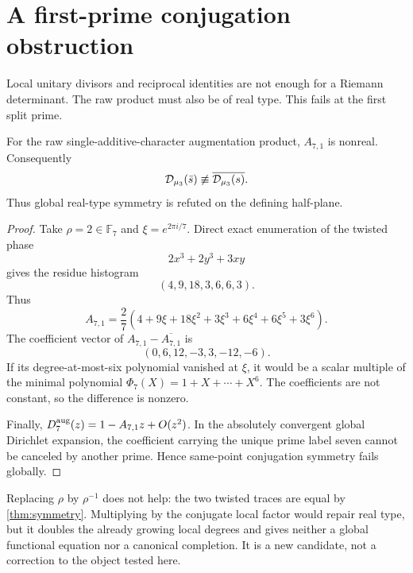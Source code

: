 \section{A first-prime conjugation obstruction}

Local unitary divisors and reciprocal identities are not enough for a
Riemann determinant.  The raw product must also be of real type.  This fails
at the first split prime.

\begin{theorem}[Exact $p=7$ obstruction]\label{thm:p7}
For the raw single-additive-character augmentation product, $A_{7,1}$ is
nonreal.  Consequently
\[
\mathcal D_{\mu_3}(\bar s)\not\equiv\overline{\mathcal D_{\mu_3}(s)}.
\]
Thus global real-type symmetry is refuted on the defining half-plane.
\end{theorem}

\begin{proof}
Take $\rho=2\in\mathbb F_7$ and $\xi=e^{2\pi i/7}$.  Direct exact
enumeration of the twisted phase
\[
2x^3+2y^3+3xy
\]
gives the residue histogram
\[
(4,9,18,3,6,6,3).
\]
Thus
\[
A_{7,1}=\frac27(4+9\xi+18\xi^2+3\xi^3+6\xi^4+6\xi^5+3\xi^6).
\]
The coefficient vector of $A_{7,1}-\overline{A_{7,1}}$ is
\[
(0,6,12,-3,3,-12,-6).
\]
If its degree-at-most-six polynomial vanished at $\xi$, it would be a scalar
multiple of the minimal polynomial
$\Phi_7(X)=1+X+\cdots+X^6$.  The coefficients are not constant, so the
difference is nonzero.

Finally, $D^{\mathrm{aug}}_7(z)=1-A_{7,1}z+O(z^2)$.  In the absolutely convergent global
Dirichlet expansion, the coefficient carrying the unique prime label seven
cannot be canceled by another prime.  Hence same-point conjugation symmetry
fails globally.
\end{proof}

Replacing $\rho$ by $\rho^{-1}$ does not help: the two twisted traces are
equal by \cref{thm:symmetry}.  Multiplying by the conjugate local factor would
repair real type, but it doubles the already growing local degrees and gives
neither a global functional equation nor a canonical completion.  It is a
new candidate, not a correction to the object tested here.
